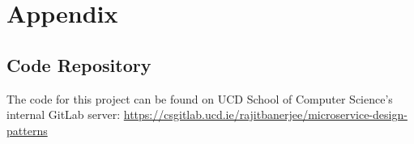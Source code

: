 \chapter{Appendix}


\section{Code Repository}

The code for this project can be found on UCD School of Computer Science's internal GitLab server: \url{https://csgitlab.ucd.ie/rajitbanerjee/microservice-design-patterns}



